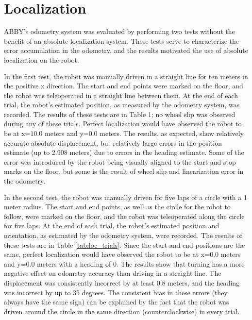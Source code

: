 \documentclass[]{cwru} %
\begin{document}
\section{Localization}

ABBY's odometry system was evaluated by performing two tests without the
benefit of an absolute localization system. These tests serve to
characterize the error accumulation in the odometry, and the results
motivated the use of absolute localization on the robot.

In the first test, the robot was manually driven in a straight line for
ten meters in the positive x direction. The start and end points were
marked on the floor, and the robot was teleoperated in a straight line
between them. At the end of each trial, the robot's estimated position,
as measured by the odometry system, was recorded. The results of these
tests are in Table 1; no wheel slip was observed during any of these
trials. Perfect localization would have observed the robot to be at
x=10.0 meters and y=0.0 meters. The results, as expected, show
relatively accurate absolute displacement, but relatively large errors
in the position estimate (up to 2.908 meters) due to errors in the
heading estimate. Some of the error was introduced by the robot being
visually aligned to the start and stop marks on the floor, but some is
the result of wheel slip and linearization error in the odometry.

In the
second test, the robot was manually driven for five laps of a circle
with a 1 meter radius. The start and end points, as well as the circle
for the robot to follow, were marked on the floor, and the robot was
teleoperated along the circle for five laps. At the end of each trial,
the robot's estimated position and orientation, as estimated by the
odometry system, were recorded. The results of these tests are in Table \ref{tab:loc_trials}. Since the start and end positions are the same, perfect localization
would have observed the robot to be at x=0.0 meters and y=0.0 meters
with a heading of 0. The results show that turning has a more negative
effect on odometry accuracy than driving in a straight line. The
displacement was consistently incorrect by at least 0.8 meters, and the
heading was incorrect by up to 35 degrees. The consistent bias in these
errors (they always have the same sign) can be explained by the fact
that the robot was driven around the circle in the same direction
(counterclockwise) in every trial.
\end{document}
